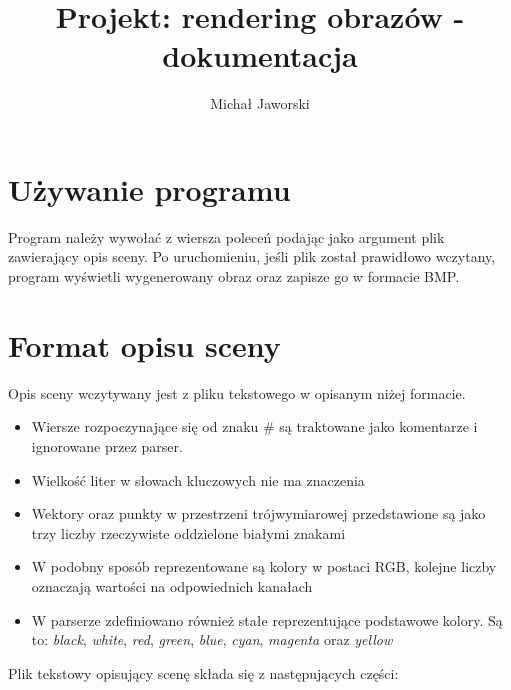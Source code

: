 \documentclass[11pt,a4paper]{article}
\title{\vspace{-2.0cm}\textbf{Projekt: rendering obrazów - dokumentacja}}
\author{Michał Jaworski}
\begin{document}
\maketitle
\section{Używanie programu}
Program należy wywołać z wiersza poleceń podając jako argument plik zawierający opis sceny. Po uruchomieniu, jeśli plik został prawidłowo wczytany, program wyświetli wygenerowany obraz oraz zapisze go w formacie BMP.
\section{Format opisu sceny}
Opis sceny wczytywany jest z pliku tekstowego w opisanym niżej formacie.
\begin{itemize}
\item Wiersze rozpoczynające się od znaku \# są traktowane jako komentarze i ignorowane przez parser.
\item Wielkość liter w słowach kluczowych nie ma znaczenia
\item Wektory oraz punkty w przestrzeni trójwymiarowej przedstawione są jako trzy liczby rzeczywiste oddzielone białymi znakami
\item W podobny sposób reprezentowane są kolory w postaci RGB, kolejne liczby oznaczają wartości na odpowiednich kanałach
\item W parserze zdefiniowano również stałe reprezentujące podstawowe kolory. Są to: \textit{black}, \textit{white}, \textit{red}, \textit{green}, \textit{blue}, \textit{cyan}, \textit{magenta} oraz \textit{yellow}
\end{itemize}
Plik tekstowy opisujący scenę składa się z następujących części:
\end{document}
